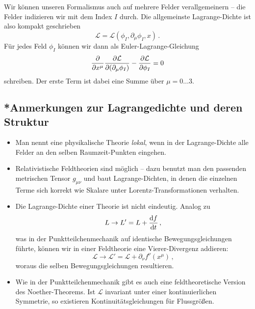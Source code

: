 \documentclass[paper=a4, fontsize=11.0pt, abstractoff, DIV12]{scrartcl}
\newcommand{\LD}{\ensuremath{\mathcal{L}}}
\begin{document}
Wir können unseren Formalismus auch auf mehrere Felder verallgemeinern --
die Felder indizieren wir mit dem Index $I$ durch. Die allgemeinste
Lagrange-Dichte ist also kompakt geschrieben
\begin{equation}
\LD = \LD(\phi_I, \partial_\mu\phi_I, x)\,.
\end{equation}
Für jedes Feld $\phi_I$ können wir dann als Euler-Lagrange-Gleichung
\begin{equation}
\firstpderiv{}{x^\mu}\firstpderiv{\LD}{(\partial_\mu\phi_I)} - \firstpderiv{\LD}{\phi_I} = 0
\label{eq:ELG}
\end{equation}
schreiben. Der erste Term ist dabei eine Summe über $\mu = 0\dots3$.

\subsection{*Anmerkungen zur Lagrangedichte und deren Struktur}

\begin{itemize}
    \item Man nennt eine physikalische Theorie \emph{lokal}, wenn in der
    Lagrange-Dichte alle Felder an den selben Raumzeit-Punkten eingehen.

    \item Relativistische Feldtheorien sind möglich -- dazu benutzt man den
    passenden metrischen Tensor $g_{\mu\nu}$ und baut Lagrange-Dichten, in
    denen die einzelnen Terme sich korrekt wie Skalare unter
    Lorentz-Transformationen verhalten.

    \item Die Lagrange-Dichte einer Theorie ist nicht eindeutig. Analog zu
    \begin{equation}
    L \to L' = L + \frac{\mathrm{d}f}{\mathrm{d}t}\,,
    \end{equation}
    was in der Punktteilchenmechanik auf identische Bewegungsgleichungen
    führte, können wir in einer Feldtheorie eine Vierer-Divergenz addieren:
    \begin{equation}
    \LD \to \LD' = \LD + \partial_\nu f^\nu(x^\mu)\,,
    \end{equation}
    woraus die selben Bewegungsgleichungen resultieren.

    \item Wie in der Punktteilchenmechanik gibt es auch eine
    feldtheoretische Version des Noether-Theorems. Ist $\LD$ invariant unter
    einer kontinuierlichen Symmetrie, so existieren Kontinuitätsgleichungen
    für Flussgrößen.
\end{itemize}
\end{document}
